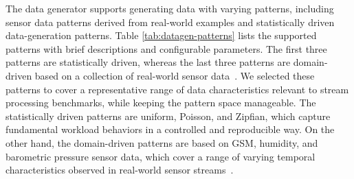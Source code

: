 \documentclass[runningheads]{llncs}
\begin{document}
The data generator supports generating data with varying patterns, including sensor data patterns derived from real-world examples and statistically driven data-generation patterns.
Table \ref{tab:datagen-patterns} lists the supported patterns with brief descriptions and configurable parameters.
The first three patterns are statistically driven, whereas the last three patterns are domain-driven based on a collection of real-world sensor data~\cite{sensor-patterns}.
We selected these patterns to cover a representative range of data characteristics relevant to stream processing benchmarks, while keeping the pattern space manageable.
The statistically driven patterns are uniform, Poisson, and Zipfian, which capture fundamental workload behaviors in a controlled and reproducible way.
On the other hand, the domain-driven patterns are based on GSM, humidity, and barometric pressure sensor data, which cover a range of varying temporal characteristics observed in real-world sensor streams~\cite{sensor-patterns}.
\end{document}
